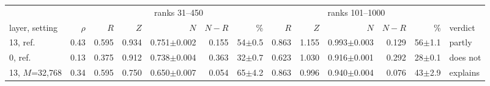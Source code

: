 \begin{tabular}{l r rrrrr rrrrr l}
\toprule
 & & \multicolumn{5}{c}{ranks 31--450} & \multicolumn{5}{c}{ranks 101--1000} & \\
\cmidrule(lr){3-7}\cmidrule(lr){8-12}
layer, setting & $\rho$ & $R$ & $Z$ & $N$ & $N-R$ & \% & $R$ & $Z$ & $N$ & $N-R$ & \% & verdict \\
\midrule
13, ref. & 0.43 & 0.595 & 0.934 & 0.751$\pm$0.002 & 0.155 & 54$\pm$0.5 & 0.863 & 1.155 & 0.993$\pm$0.003 & 0.129 & 56$\pm$1.1 & partly \\
0, ref. & 0.13 & 0.375 & 0.912 & 0.738$\pm$0.004 & 0.363 & 32$\pm$0.7 & 0.623 & 1.030 & 0.916$\pm$0.001 & 0.292 & 28$\pm$0.1 & does not \\
13, $M$=32,768 & 0.34 & 0.595 & 0.750 & 0.650$\pm$0.007 & 0.054 & 65$\pm$4.2 & 0.863 & 0.996 & 0.940$\pm$0.004 & 0.076 & 43$\pm$2.9 & explains \\
\bottomrule
\end{tabular}
